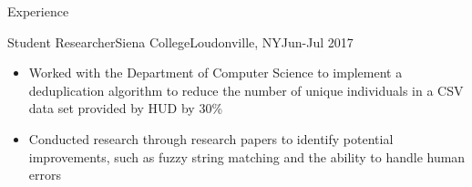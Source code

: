 \documentclass[]{xjavathehutt}
\begin{document}
\begin{cvsection}{Experience}
  \begin{cvsubsection}{Student Researcher}{Siena College}{Loudonville, NY}{Jun-Jul 2017}
    \begin{itemize}
      \item{Worked with the Department of Computer Science to implement a deduplication algorithm to
          reduce the number of unique individuals in a CSV data set provided by HUD by 30\%}
      \item{Conducted research through research papers to identify potential
        improvements, such as fuzzy string matching and the ability to handle human errors}
    \end{itemize}
  \end{cvsubsection}
\end{cvsection}


\end{document}
